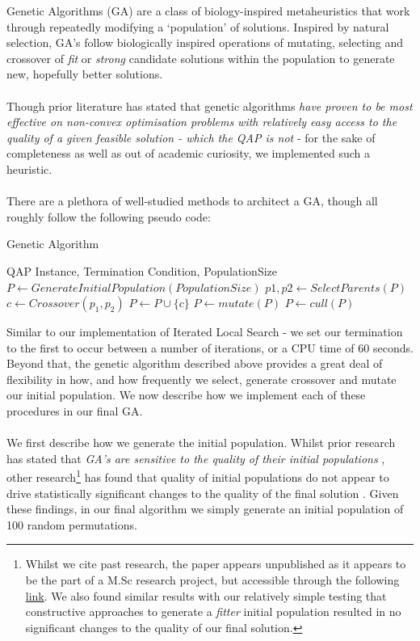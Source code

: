 \documentclass[a4paper,10pt]{article}
\begin{document}
Genetic Algorithms (GA) are a class of biology-inspired metaheuristics that work through repeatedly modifying a `population' of solutions. Inspired by natural selection, GA's follow biologically inspired operations of mutating, selecting and crossover of \textit{fit} or \textit{strong} candidate solutions within the population to generate new, hopefully better solutions.\\
\\
Though prior literature has stated that genetic algorithms \textit{have proven to be most effective on non-convex optimisation problems with relatively easy access to the quality of a given feasible solution - which the QAP is not} \cite{TATE199573} - for the sake of completeness as well as out of academic curiosity, we implemented such a heuristic. \\
\\
There are a plethora of well-studied methods to architect a GA, though all roughly follow the following pseudo code: 
\begin{algorithm}
\caption{Genetic Algorithm}\label{alg:cap}
\begin{algorithmic}
\Require QAP Instance, Termination Condition, PopulationSize
\State $P \gets GenerateInitialPopulation(PopulationSize)$
    \State $p1, p2 \gets SelectParents(P)$
    \State $c \gets Crossover(p_1, p_2)$ 
    \State $P\gets P\cup\{c\}$
    \State $P \gets mutate(P)$
    \State $P \gets cull(P)$ 
\EndWhile
\end{algorithmic}
\end{algorithm}
Similar to our implementation of Iterated Local Search - we set our termination to the first to occur between a  number of iterations, or a CPU time of 60 seconds. Beyond that, the genetic algorithm described above provides a great deal of flexibility in how, and how frequently we select, generate crossover and mutate our initial population. We now describe how we implement each of these procedures in our final GA. \\
\\
We first describe how we generate the initial population. Whilst prior research has stated that \textit{GA's are sensitive to the quality of their initial populations} \cite{TATE199573}, other research\footnote{Whilst we cite past research, the paper appears unpublished as it appears to be the part of a M.Sc research project, but accessible through the following \href{https://www.siam.org/Portals/0/Documents/S140619PDF.pdf?ver=2021-08-29-110233-343}{link}. We also found similar results with our relatively simple testing that constructive approaches to generate a \textit{fitter} initial population resulted in no significant changes to the quality of our final solution.} has found that quality of initial populations do not appear to drive statistically significant changes to the quality of the final solution \cite{GAPopulation}. Given these findings, in our final algorithm we simply generate an initial population of 100 random permutations. \\
\end{document}
